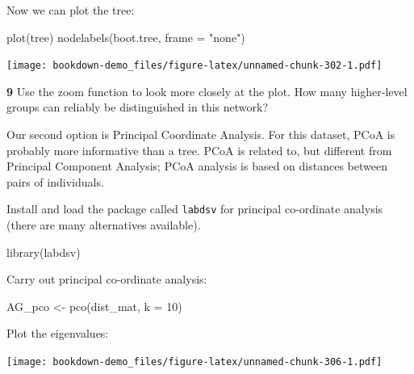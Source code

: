 \documentclass[
]{book}
\makeatletter
\newenvironment{Shaded}{\begin{snugshade}}{\end{snugshade}}
\newcommand{\AttributeTok}[1]{\textcolor[rgb]{0.77,0.63,0.00}{#1}}
\newcommand{\DecValTok}[1]{\textcolor[rgb]{0.00,0.00,0.81}{#1}}
\newcommand{\FunctionTok}[1]{\textcolor[rgb]{0.00,0.00,0.00}{#1}}
\newcommand{\NormalTok}[1]{#1}
\newcommand{\OtherTok}[1]{\textcolor[rgb]{0.56,0.35,0.01}{#1}}
\newcommand{\SpecialCharTok}[1]{\textcolor[rgb]{0.00,0.00,0.00}{#1}}
\newcommand{\StringTok}[1]{\textcolor[rgb]{0.31,0.60,0.02}{#1}}
\newenvironment{kframe}{%
\medskip{}
\setlength{\fboxsep}{.8em}
 \def\at@end@of@kframe{}%
 \ifinner\ifhmode%
  \def\at@end@of@kframe{\end{minipage}}%
  \begin{minipage}{\columnwidth}%
 \fi\fi%
 \def\FrameCommand##1{\hskip\@totalleftmargin \hskip-\fboxsep
 \colorbox{shadecolor}{##1}\hskip-\fboxsep
     \hskip-\linewidth \hskip-\@totalleftmargin \hskip\columnwidth}%
 \MakeFramed {\advance\hsize-\width
   \@totalleftmargin\z@ \linewidth\hsize
   \@setminipage}}%
 {\par\unskip\endMakeFramed%
 \at@end@of@kframe}
\newenvironment{rmdblock}[1]
  {
  \begin{itemize}
  \renewcommand{\labelitemi}{
    \raisebox{-.7\height}[0pt][0pt]{
      {\setkeys{Gin}{width=3em,keepaspectratio}\texttt{[image: images/\#1]}}
    }
  }
  \setlength{\fboxsep}{1em}
  \begin{kframe}
  \item
  }
  {
  \end{kframe}
  \end{itemize}
  }
\newenvironment{rmdquiz}
  {\begin{rmdblock}{quiz}}
  {\end{rmdblock}}
\makeatother
\begin{document}
Now we can plot the tree:

\begin{Shaded}
\begin{Highlighting}[]
\FunctionTok{plot}\NormalTok{(tree)}
\FunctionTok{nodelabels}\NormalTok{(boot.tree, }\AttributeTok{frame =} \StringTok{"none"}\NormalTok{)}
\end{Highlighting}
\end{Shaded}

\texttt{[image: bookdown-demo\_files/figure-latex/unnamed-chunk-302-1.pdf]}

\begin{rmdquiz}
\textbf{9} Use the zoom function to look more closely at the plot. How many higher-level groups can reliably be distinguished in this network?
\end{rmdquiz}

Our second option is Principal Coordinate Analysis. For this dataset, PCoA is probably more informative than a tree. PCoA is related to, but different from Principal Component Analysis; PCoA analysis is based on distances between pairs of individuals.

Install and load the package called \texttt{labdsv} for principal co-ordinate analysis (there are many alternatives available).

\begin{Shaded}
\begin{Highlighting}[]
\FunctionTok{library}\NormalTok{(labdsv)}
\end{Highlighting}
\end{Shaded}

Carry out principal co-ordinate analysis:

\begin{Shaded}
\begin{Highlighting}[]
\NormalTok{AG\_pco }\OtherTok{\textless{}{-}} \FunctionTok{pco}\NormalTok{(dist\_mat, }\AttributeTok{k =} \DecValTok{10}\NormalTok{)}
\end{Highlighting}
\end{Shaded}

Plot the eigenvalues:

\begin{Shaded}
\end{Shaded}

\texttt{[image: bookdown-demo\_files/figure-latex/unnamed-chunk-306-1.pdf]}
\end{document}
